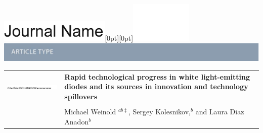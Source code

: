\documentclass[twoside,twocolumn,9pt]{article}
\begin{document}
  \begin{@twocolumnfalse}
{\includegraphics[height=30pt]{auxiliary/rsc_template_head_foot/journal_name}\hfill\raisebox{0pt}[0pt][0pt]{\includegraphics[height=55pt]{auxiliary/rsc_template_head_foot/RSC_LOGO_CMYK}}\\[1ex]
\includegraphics[width=18.5cm]{auxiliary/rsc_template_head_foot/header_bar}}\par
\vspace{1em}
\sffamily
\begin{tabular}{m{4.5cm} p{13.5cm} }

\includegraphics{auxiliary/rsc_template_head_foot/DOI} & \noindent\LARGE{\textbf{Rapid technological progress in white light-emitting diodes and its sources in innovation and technology spillovers}} \\
\vspace{0.3cm} & \vspace{0.3cm} \\

 & \noindent\large{Michael Weinold \textit{$^{a b \ddag}$}, Sergey Kolesnikov,\textit{$^b$} and Laura Diaz Anadon\textit{$^{b}$}} \\


\end{tabular}
\end{@twocolumnfalse}
\end{document}
